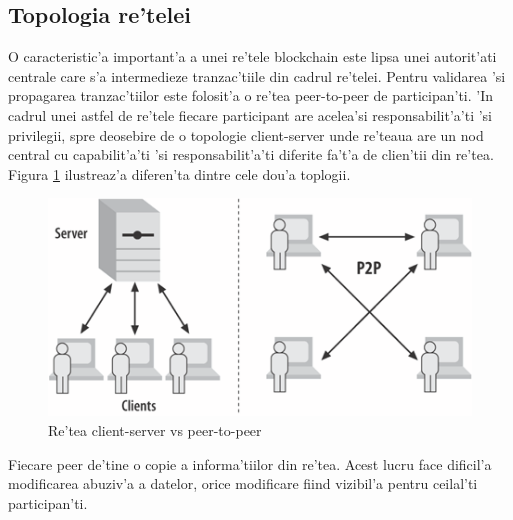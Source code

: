 \documentclass[12pt,a4paper,twoside]{report}
\begin{document}
	\subsection{Topologia re'telei}
	O caracteristic'a important'a a unei re'tele blockchain este lipsa unei autorit'ati centrale care s'a intermedieze tranzac'tiile din cadrul re'telei. Pentru validarea 'si propagarea tranzac'tiilor este folosit'a o re'tea peer-to-peer de participan'ti\cite{p2p}. 'In cadrul unei astfel de re'tele fiecare participant are acelea'si responsabilit'a'ti 'si privilegii, spre deosebire de o topologie client-server unde re'teaua are un nod central cu capabilit'a'ti 'si responsabilit'a'ti diferite fa't'a de clien'tii din re'tea. Figura \ref{fig:p2p} ilustreaz'a diferen'ta dintre cele dou'a toplogii.
			\begin{figure}[H]
		\begin{center}
			\includegraphics[scale=2]{img/p2p.png}
			\caption{Re'tea client-server vs peer-to-peer\cite{fabricdoc}}
  			\label{fig:p2p}
  		\end{center}
  		\end{figure}
Fiecare peer de'tine o copie a informa'tiilor din re'tea. Acest lucru face dificil'a modificarea abuziv'a a datelor, orice modificare fiind vizibil'a pentru ceilal'ti participan'ti.   
\end{document}
